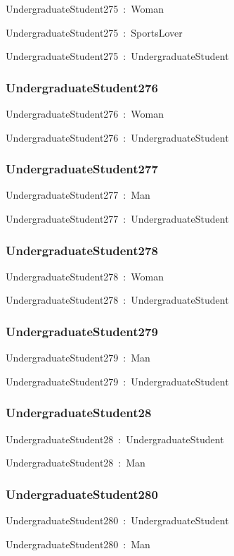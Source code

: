 \documentclass{article}
\begin{document}
UndergraduateStudent275~:~Woman

UndergraduateStudent275~:~SportsLover

UndergraduateStudent275~:~UndergraduateStudent

\subsubsection*{UndergraduateStudent276}

UndergraduateStudent276~:~Woman

UndergraduateStudent276~:~UndergraduateStudent

\subsubsection*{UndergraduateStudent277}

UndergraduateStudent277~:~Man

UndergraduateStudent277~:~UndergraduateStudent

\subsubsection*{UndergraduateStudent278}

UndergraduateStudent278~:~Woman

UndergraduateStudent278~:~UndergraduateStudent

\subsubsection*{UndergraduateStudent279}

UndergraduateStudent279~:~Man

UndergraduateStudent279~:~UndergraduateStudent

\subsubsection*{UndergraduateStudent28}

UndergraduateStudent28~:~UndergraduateStudent

UndergraduateStudent28~:~Man

\subsubsection*{UndergraduateStudent280}

UndergraduateStudent280~:~UndergraduateStudent

UndergraduateStudent280~:~Man
\end{document}
